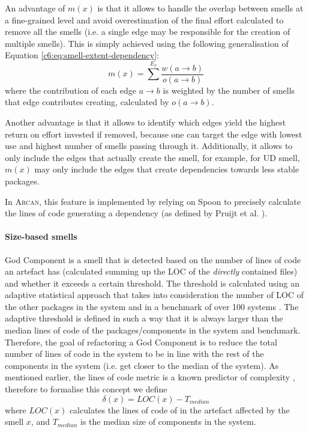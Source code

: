 An advantage of $m(x)$ is that it allows to handle the overlap between smells at a fine-grained level and avoid overestimation of the final effort calculated to remove all the smells (i.e. a single edge may be responsible for the creation of multiple smells). 
This is simply achieved using the following generalisation of Equation \ref{c6:eq:smell-extent-dependency}:
\begin{equation}\label{c6:eq:smell-extent-dependency-weight}
m(x) = \sum^{E_x} \frac{w(a\rightarrow b)}{o(a \rightarrow b)}
\end{equation}
where the contribution of each edge $a \rightarrow b$ is weighted by the number of smells that edge contributes creating, calculated by $o(a \rightarrow b)$.

Another advantage is that it allows to identify which edges yield the highest return on effort invested if removed, because one can target the edge with lowest use and highest number of smells passing through it.
Additionally, it allows to only include the edges that actually create the smell, for example, for UD smell, $m(x)$ may only include the edges that create dependencies towards less stable packages.

In \textsc{Arcan}, this feature is implemented by relying on Spoon \cite{Pawlak2015} to precisely calculate the lines of code generating a dependency (as defined by Pruijt et al. \cite{Pruijt2017}).

\paragraph{Size-based smells}
God Component is a smell that is detected based on the number of lines of code an artefact has (calculated summing up the LOC of the \emph{directly} contained files) and whether it exceeds a certain threshold.
The threshold is calculated using an adaptive statistical approach that takes into consideration  the number of LOC of the other packages in the system and in a benchmark of over 100 systems \cite{Arcelli2015}.
The adaptive threshold is defined in such a way that it is always larger than the median lines of code of the packages/components in the system and benchmark.
Therefore, the goal of refactoring a God Component is to reduce the total number of lines of code in the system to be in line with the rest of the components in the system (i.e. get closer to the median of the system).
As mentioned earlier, the lines of code metric is a known predictor of complexity \cite{Lippert2006, Morasca2001, Kitchenham2004}, therefore to formalise this concept we define 
\begin{equation}\label{c6:eq:smell-extent-gc-threshold}
    \delta(x) = LOC(x) - T_{median}   
\end{equation}
where $LOC(x)$ calculates the lines of code of in the artefact affected by the smell $x$, and $T_{median}$ is the median size of components in the system.

